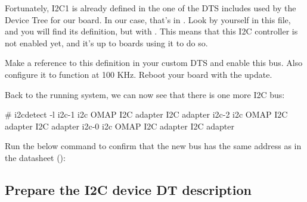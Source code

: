 Fortunately, I2C1 is already defined in the one of the DTS includes
used by the Device Tree for our board. In our case, that's in
. Look by yourself in this
file, and you will find its definition, but with . This means that this I2C controller is not enabled yet,
and it's up to boards using it to do so.

Make a reference to this definition in your custom DTS and enable this
bus. Also configure it to function at 100 KHz. Reboot your board with
the update.

Back to the running system, we can now see that there is one more
I2C bus:

\begin{bashinput}
# i2cdetect -l
i2c-1	i2c             OMAP I2C adapter                        I2C adapter
i2c-2	i2c             OMAP I2C adapter                        I2C adapter
i2c-0	i2c             OMAP I2C adapter                        I2C adapter
\end{bashinput}

Run the below command to confirm that the new bus has the same address
as in the datasheet ():


\subsection{Prepare the I2C device DT description}

